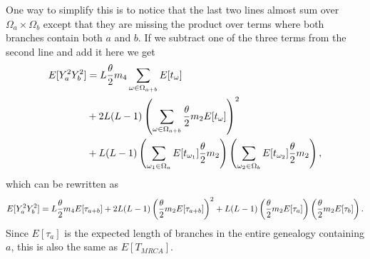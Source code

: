 One way to simplify this is to notice that the last two lines almost sum over
$\Omega_a\times\Omega_b$ except that they are missing the product over terms
where both branches contain both $a$ and $b$. If we subtract one of the three
terms from the second line and add it here we get
\begin{align*}
  E[Y_a^2Y_b^2] &= L \frac{\theta}{2} m_4 \sum_{\omega \in \Omega_{a+b}} E[t_\omega] \\
  &+ 2L(L-1) \left( \sum_{\omega \in \Omega_{a+b}} \frac{\theta}{2} m_2 E[t_\omega] \right)^2\\
  &+ L(L-1) \left( \sum_{\omega_1 \in \Omega_{a}} E[t_{\omega_1}] \frac{\theta}{2} m_2  \right)
  \left( \sum_{\omega_2 \in \Omega_{b}} E[t_{\omega_2}] \frac{\theta}{2} m_2 \right),
\end{align*}
which can be rewritten as
\begin{equation}
  \label{eq:cross4}
  E[Y_a^2Y_b^2] = L \frac{\theta}{2} m_4 E[\tau_{a+b}]+2L(L-1) \left(\frac{\theta}{2} m_2 E[\tau_{a+b}]\right)^2
  + L(L-1) \left( \frac{\theta}{2} m_2 E[\tau_a]\right)\left( \frac{\theta}{2} m_2 E[\tau_b]\right).
\end{equation}
Since $E[\tau_a]$ is the expected length of branches in the entire genealogy
containing $a$, this is also the same as $E[T_{MRCA}]$.
